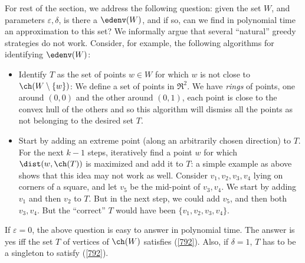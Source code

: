 For rest of the section, we address the following question: given the set $W$, and parameters $\varepsilon, \delta$, is there a  $\edenv(W)$, and if so, can we find in polynomial time an approximation to this set? We informally argue that several ``natural'' greedy strategies do not work. Consider, for example, the following algorithms for identifying $\edenv(W)$: 
\begin{itemize}
    \item Identify $T$ as the set of points $w\in W$ for which $w$ is not close to $\ch(W\setminus \{w\})$: We define a set of points in $\Re^2$. We have {\em rings} of points, one around $ (0,0)$ and the other around $(0,1)$, each point is close to the convex hull of the others and so this algorithm will   dismiss all the points as not belonging to the desired set $T$.
    \item Start by adding an extreme point (along an arbitrarily chosen direction) to $T$. For the next $k-1$ steps, iteratively find a point $w$ for which $\dist(w,\ch(T))$ is maximized and add it to $T$: a simple example as above shows that this idea may not work as well. Consider $v_1, v_2, v_3, v_4$ lying on corners of a square, and let $v_5$ be the mid-point of $v_3, v_4$. We start by adding $v_1$ and then $v_2$ to $T$. But in the next step, we could add $v_5$, and then both $v_3, v_4$. But the ``correct'' $T$ would have been $\{v_1, v_2, v_3, v_4\}$. 
\end{itemize}
 


If $\varepsilon=0$, the above question is easy to answer in polynomial time. The answer is yes iff the set $T$ of vertices of $\ch(W)$ satisfies (\ref{792}). Also, if $\delta=1$, $T$ has to be a singleton to satisfy (\ref{792}). 

